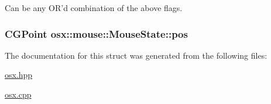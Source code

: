 Can be any O\-R'd combination of the above flags. 

\hypertarget{structosx_1_1mouse_1_1_mouse_state_a046eeff3d384ad60cf22e3650b5ee0a4}{
\subsubsection[{pos}]{\setlength{\rightskip}{0pt plus 5cm}C\-G\-Point {\bf osx\-::mouse\-::\-Mouse\-State\-::pos}}}\label{structosx_1_1mouse_1_1_mouse_state_a046eeff3d384ad60cf22e3650b5ee0a4}


The documentation for this struct was generated from the following files\-:\begin{DoxyCompactItemize}
\item 
\hyperlink{osx_8hpp}{osx.\-hpp}\item 
\hyperlink{osx_8cpp}{osx.\-cpp}\end{DoxyCompactItemize}
